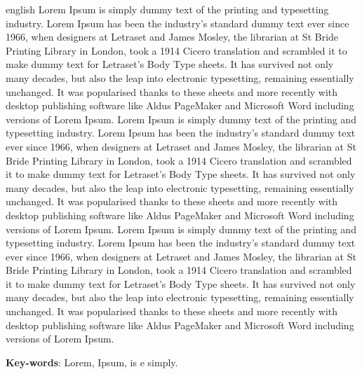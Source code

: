 \begin{resumo}[Abstract]
 \begin{otherlanguage*}{english}
Lorem Ipsum is simply dummy text of the printing and typesetting industry. Lorem Ipsum has been the industry's standard dummy text ever since 1966, when designers at Letraset and James Mosley, the librarian at St Bride Printing Library in London, took a 1914 Cicero translation and scrambled it to make dummy text for Letraset's Body Type sheets. It has survived not only many decades, but also the leap into electronic typesetting, remaining essentially unchanged. It was popularised thanks to these sheets and more recently with desktop publishing software like Aldus PageMaker and Microsoft Word including versions of Lorem Ipsum.
Lorem Ipsum is simply dummy text of the printing and typesetting industry. Lorem Ipsum has been the industry's standard dummy text ever since 1966, when designers at Letraset and James Mosley, the librarian at St Bride Printing Library in London, took a 1914 Cicero translation and scrambled it to make dummy text for Letraset's Body Type sheets. It has survived not only many decades, but also the leap into electronic typesetting, remaining essentially unchanged. It was popularised thanks to these sheets and more recently with desktop publishing software like Aldus PageMaker and Microsoft Word including versions of Lorem Ipsum.
Lorem Ipsum is simply dummy text of the printing and typesetting industry. Lorem Ipsum has been the industry's standard dummy text ever since 1966, when designers at Letraset and James Mosley, the librarian at St Bride Printing Library in London, took a 1914 Cicero translation and scrambled it to make dummy text for Letraset's Body Type sheets. It has survived not only many decades, but also the leap into electronic typesetting, remaining essentially unchanged. It was popularised thanks to these sheets and more recently with desktop publishing software like Aldus PageMaker and Microsoft Word including versions of Lorem Ipsum.



   \vspace{\onelineskip}
 
   \noindent 
   \textbf{Key-words}: Lorem, Ipsum, is e simply.
 \end{otherlanguage*}
\end{resumo}